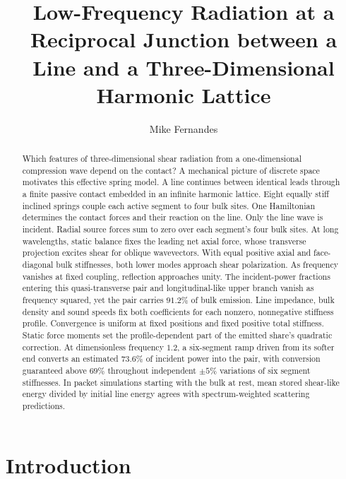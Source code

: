\documentclass[10pt,aps,onecolumn,floatfix,notitlepage,nofootinbib,showkeys]{revtex4-2}
\begin{document}
\title{Low-Frequency Radiation at a Reciprocal Junction between a Line and a Three-Dimensional Harmonic Lattice}
\author{Mike Fernandes}

\begin{abstract}
Which features of three-dimensional shear radiation from a one-dimensional compression wave depend on the contact? A mechanical picture of discrete space motivates this effective spring model. A line continues between identical leads through a finite passive contact embedded in an infinite harmonic lattice. Eight equally stiff inclined springs couple each active segment to four bulk sites. One Hamiltonian determines the contact forces and their reaction on the line. Only the line wave is incident. Radial source forces sum to zero over each segment's four bulk sites. At long wavelengths, static balance fixes the leading net axial force, whose transverse projection excites shear for oblique wavevectors. With equal positive axial and face-diagonal bulk stiffnesses, both lower modes approach shear polarization. As frequency vanishes at fixed coupling, reflection approaches unity. The incident-power fractions entering this quasi-transverse pair and longitudinal-like upper branch vanish as frequency squared, yet the pair carries $91.2\%$ of bulk emission. Line impedance, bulk density and sound speeds fix both coefficients for each nonzero, nonnegative stiffness profile. Convergence is uniform at fixed positions and fixed positive total stiffness. Static force moments set the profile-dependent part of the emitted share's quadratic correction. At dimensionless frequency $1.2$, a six-segment ramp driven from its softer end converts an estimated $73.6\%$ of incident power into the pair, with conversion guaranteed above $69\%$ throughout independent $\pm5\%$ variations of six segment stiffnesses. In packet simulations starting with the bulk at rest, mean stored shear-like energy divided by initial line energy agrees with spectrum-weighted scattering predictions.
\end{abstract}
\maketitle

\section{Introduction}
\label{sec:scope}
\end{document}

